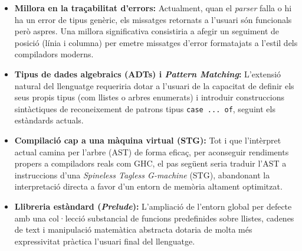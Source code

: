 \begin{itemize}
    \item \textbf{Millora en la traçabilitat d'errors:} Actualment, quan el \textit{parser} falla o hi ha un error de tipus genèric, els missatges retornats a l'usuari són funcionals però aspres. Una millora significativa consistiria a afegir un seguiment de posició (línia i columna) per emetre missatges d'error formatajats a l'estil dels compiladors moderns.
    \item \textbf{Tipus de dades algebraics (ADTs) i \textit{Pattern Matching}:} L'extensió natural del llenguatge requeriria dotar a l'usuari de la capacitat de definir els seus propis tipus (com llistes o arbres enumerats) i introduir construccions sintàctiques de reconeixement de patrons tipus \texttt{case ... of}, seguint els estàndards actuals.
    \item \textbf{Compilació cap a una màquina virtual (STG):} Tot i que l'intèrpret actual camina per l'arbre (AST) de forma eficaç, per aconseguir rendiments propers a compiladors reals com GHC, el pas següent seria traduir l'AST a instruccions d'una \textit{Spineless Tagless G-machine} (STG), abandonant la interpretació directa a favor d'un entorn de memòria altament optimitzat.
    \item \textbf{Llibreria estàndard (\textit{Prelude}):} L'ampliació de l'entorn global per defecte amb una col·lecció substancial de funcions predefinides sobre llistes, cadenes de text i manipulació matemàtica abstracta dotaria de molta més expressivitat pràctica l'usuari final del llenguatge.
\end{itemize}
